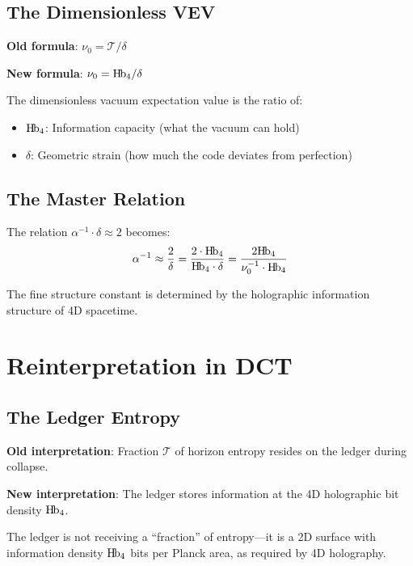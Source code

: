 \documentclass[11pt,a4paper]{article}
\newcommand{\Hb}{\textnormal{H\kern-0.12em b}}
\newcommand{\Hbfour}{\Hb_4}
\newcommand{\Tc}{\mathcal{T}}
\newcommand{\dgeo}{\delta}
\begin{document}
\subsection{The Dimensionless VEV}

\textbf{Old formula}: $\nu_0 = \Tc/\dgeo$

\textbf{New formula}: $\nu_0 = \Hbfour/\dgeo$

The dimensionless vacuum expectation value is the ratio of:
\begin{itemize}[nosep]
    \item $\Hbfour$: Information capacity (what the vacuum can hold)
    \item $\dgeo$: Geometric strain (how much the code deviates from perfection)
\end{itemize}

\subsection{The Master Relation}

The relation $\alpha^{-1} \cdot \dgeo \approx 2$ becomes:
\begin{equation}
\alpha^{-1} \approx \frac{2}{\dgeo} = \frac{2 \cdot \Hbfour}{\Hbfour \cdot \dgeo} = \frac{2\Hbfour}{\nu_0^{-1} \cdot \Hbfour} 
\end{equation}

The fine structure constant is determined by the holographic information structure of 4D spacetime.

\section{Reinterpretation in DCT}
\label{sec:dct}

\subsection{The Ledger Entropy}

\textbf{Old interpretation}: Fraction $\Tc$ of horizon entropy resides on the ledger during collapse.

\textbf{New interpretation}: The ledger stores information at the 4D holographic bit density $\Hbfour$.

The ledger is not receiving a ``fraction'' of entropy---it is a 2D surface with information density $\Hbfour$ bits per Planck area, as required by 4D holography.
\end{document}
